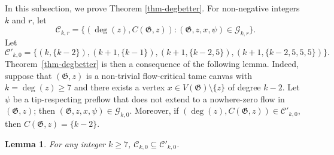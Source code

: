 \documentclass{article}
\newcommand{\GG}{\mathcal{G}}
\newcommand{\CC}{\mathcal{C}}
\newcommand\g{\mathfrak{G}}
\newtheorem{lemma}[theorem]{Lemma}
\begin{document}
In this subsection, we prove Theorem \ref{thm-degbetter}.
For non-negative integers $k$ and $r$, let
$$\CC_{k,r}=\{(\deg(z), C(\g,z)): (\g,z,x,\psi)\in\GG_{k,r}\}.$$
Let
$$\CC'_{k,0}=\{(k,\{k-2\}),(k+1,\{k-1\}),(k+1,\{k-2,5\}),(k+1,\{k-2,5,5,5\})\}.$$
Theorem~\ref{thm-degbetter} is then a consequence of the following lemma.
Indeed, suppose that $(\g,z)$ is a non-trivial flow-critical tame canvas with $k=\deg(z)\ge 7$ and
there exists a vertex $x\in V(\g)\setminus\{z\}$ of degree $k-2$. Let $\psi$ be a tip-respecting
preflow that does not extend to a nowhere-zero flow in $(\g,z)$; then $(\g,z,x,\psi)\in\GG_{k,0}$.
Moreover, if $(\deg(z), C(\g,z))\in\CC'_{k,0}$, then $C(\g,z)=\{k-2\}$.

\begin{lemma}\label{lemma-degbetter}
For any integer $k\ge 7$, $\CC_{k,0}\subseteq \CC'_{k,0}$.
\end{lemma}
\end{document}
